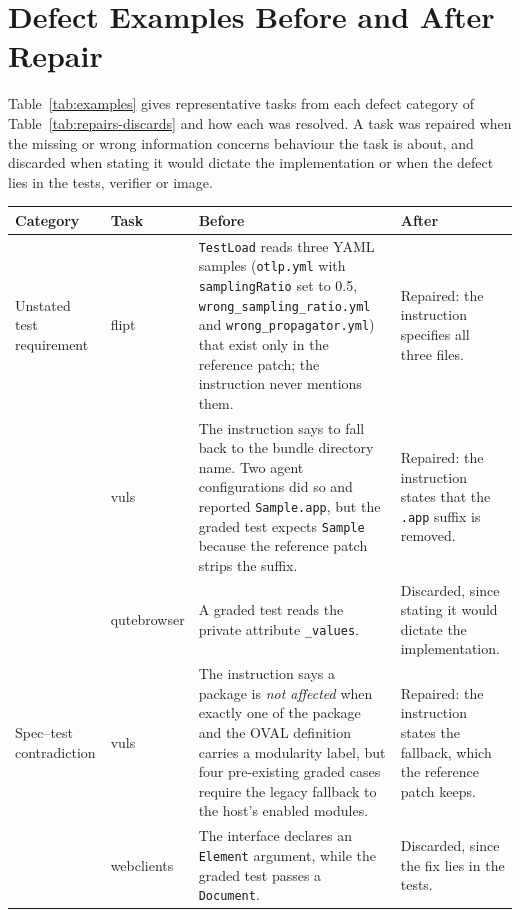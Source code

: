 \section{Defect Examples Before and After Repair}
\label{app:examples}
Table~\ref{tab:examples} gives representative tasks from each defect category of Table~\ref{tab:repairs-discards} and how each was resolved. A task was repaired when the missing or wrong information concerns behaviour the task is about, and discarded when stating it would dictate the implementation or when the defect lies in the tests, verifier or image.

\begin{table}[t]
\centering\small
\begin{tabularx}{\textwidth}{@{}>{\raggedright\arraybackslash}p{}>{\raggedright\arraybackslash}p{}>{\raggedright\arraybackslash}X>{\raggedright\arraybackslash}p{}@{}}
\toprule
Category & Task & Before & After \\
\midrule
Unstated test requirement & flipt & \texttt{TestLoad} reads three YAML samples (\texttt{otlp.yml} with \texttt{samplingRatio} set to 0.5, \texttt{wrong\_sampling\_ratio.yml} and \texttt{wrong\_propagator.yml}) that exist only in the reference patch; the instruction never mentions them. & Repaired: the instruction specifies all three files. \\
\addlinespace
 & vuls & The instruction says to fall back to the bundle directory name. Two agent configurations did so and reported \texttt{Sample.app}, but the graded test expects \texttt{Sample} because the reference patch strips the suffix. & Repaired: the instruction states that the \texttt{.app} suffix is removed. \\
\addlinespace
 & qutebrowser & A graded test reads the private attribute \texttt{\_values}. & Discarded, since stating it would dictate the implementation. \\
\addlinespace
Spec--test contradiction & vuls & The instruction says a package is \emph{not affected} when exactly one of the package and the OVAL definition carries a modularity label, but four pre-existing graded cases require the legacy fallback to the host's enabled modules. & Repaired: the instruction states the fallback, which the reference patch keeps. \\
\addlinespace
 & webclients & The interface declares an \texttt{Element} argument, while the graded test passes a \texttt{Document}. & Discarded, since the fix lies in the tests. \\

\end{tabularx}
\end{table}
